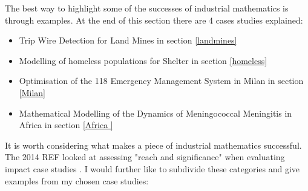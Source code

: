 \documentclass[11pt]{article} %
\begin{document}
	The best way to highlight some of the successes of industrial mathematics is through examples. At the end of this section there are 4 cases studies explained: 
	\begin{itemize}
		\item Trip Wire Detection for Land Mines in section \ref{landmines}
		\item Modelling of homeless populations for Shelter in section \ref{homeless}
		\item Optimisation of the 118 Emergency Management System in Milan in section \ref{Milan}
		\item Mathematical Modelling of the Dynamics of Meningococcal Meningitis in Africa in section \ref{Africa }
	\end{itemize}

It is worth considering what makes a piece of industrial mathematics successful. The 2014 REF looked at assessing "reach and significance" when evaluating impact case studies \cite{impactcriteria2014}. I would further like to subdivide these categories and give examples from my chosen case studies:
\end{document}
